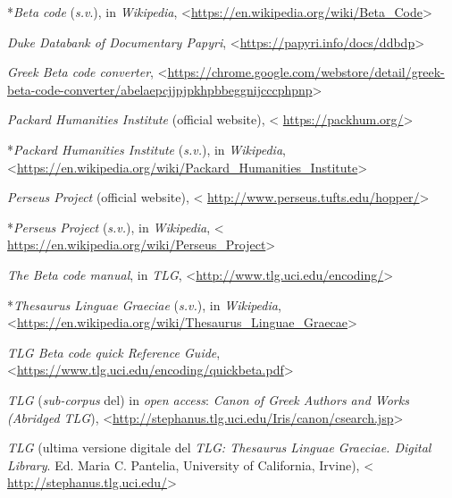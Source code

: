 \documentclass[
  b5paper,
  twoside,
  11pt,
  chapterprefix=false,
  bibliography=totocnumbered,
  listof=flat]{scrbook}
\begin{document}
*\emph{Beta code} (\emph{s.v}.), in \emph{Wikipedia},
\textless{}\href{https://en.wikipedia.org/wiki/Beta_Code}{{https://en.wikipedia.org/wiki/Beta\_Code}}\textgreater{}

\emph{Duke Databank of Documentary Papyri},
\textless{}\href{https://papyri.info/docs/ddbdp}{{https://papyri.info/docs/ddbdp}}\textgreater{}

\emph{Greek Beta code converter},
\textless{}\href{https://chrome.google.com/webstore/detail/greek-beta-code-converter/abelaepcjjpjpkhpbbeggnijcccphpnp}{{https://chrome.google.com/webstore/detail/greek-beta-code-converter/abelaepcjjpjpkhpbbeggnijcccphpnp}}\textgreater{}

\emph{Packard Humanities Institute} (official website), \textless{}
\href{https://packhum.org/}{{https://packhum.org/}}\textgreater{}

*\emph{Packard Humanities Institute} (\emph{s.v.}), in \emph{Wikipedia},
\textless{}\href{https://en.wikipedia.org/wiki/Packard_Humanities_Institute}{{https://en.wikipedia.org/wiki/Packard\_Humanities\_Institute}}\textgreater{}

\emph{Perseus Project} (official website), \textless{}
\href{http://www.perseus.tufts.edu/hopper/}{{http://www.perseus.tufts.edu/hopper/}}\textgreater{}

*\emph{Perseus Project} (\emph{s.v.}), in \emph{Wikipedia}, \textless{}
\href{https://en.wikipedia.org/wiki/Perseus_Project}{{https://en.wikipedia.org/wiki/Perseus\_Project}}\textgreater{}

\emph{The Beta code manual}, in \emph{TLG},
\textless{}\href{http://www.tlg.uci.edu/encoding/}{{http://www.tlg.uci.edu/encoding/}}\textgreater{}

*\emph{Thesaurus Linguae Graeciae} (\emph{s.v.}), in \emph{Wikipedia},
\textless{}\href{https://en.wikipedia.org/wiki/Thesaurus_Linguae_Graecae}{{https://en.wikipedia.org/wiki/Thesaurus\_Linguae\_Graecae}}\textgreater{}

\emph{TLG Beta code quick Reference Guide},
\textless{}\href{https://www.tlg.uci.edu/encoding/quickbeta.pdf}{{https://www.tlg.uci.edu/encoding/quickbeta.pdf}}\textgreater{}

\emph{TLG} (\emph{sub-corpus} del) in \emph{open access}: \emph{Canon of Greek Authors and
Works (Abridged TLG}),
\textless{}\href{http://stephanus.tlg.uci.edu/Iris/canon/csearch.jsp}{{http://stephanus.tlg.uci.edu/Iris/canon/csearch.jsp}}\textgreater{}

\emph{TLG} (ultima versione digitale del \emph{TLG: Thesaurus Linguae Graeciae.
Digital Library}. Ed. Maria C. Pantelia, University of California,
Irvine), \textless{}
\href{http://stephanus.tlg.uci.edu/}{{http://stephanus.tlg.uci.edu/}}\textgreater{}
\end{document}
